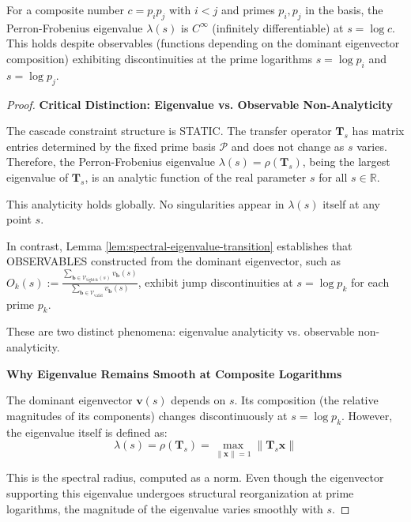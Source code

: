 \begin{lemma}
\label{lem:smoothness-composites}
For a composite number $c = p_i p_j$ with $i < j$ and primes $p_i, p_j$ in the basis, the Perron-Frobenius eigenvalue $\lambda(s)$ is $C^\infty$ (infinitely differentiable) at $s = \log c$. This holds despite observables (functions depending on the dominant eigenvector composition) exhibiting discontinuities at the prime logarithms $s = \log p_i$ and $s = \log p_j$.
\end{lemma}

\begin{proof}

\noindent \textbf{Critical Distinction: Eigenvalue vs. Observable Non-Analyticity}

The cascade constraint structure is STATIC. The transfer operator $\mathbf{T}_s$ has matrix entries determined by the fixed prime basis $\mathcal{P}$ and does not change as $s$ varies. Therefore, the Perron-Frobenius eigenvalue $\lambda(s) = \rho(\mathbf{T}_s)$, being the largest eigenvalue of $\mathbf{T}_s$, is an analytic function of the real parameter $s$ for all $s \in \mathbb{R}$.

This analyticity holds globally. No singularities appear in $\lambda(s)$ itself at any point $s$.

In contrast, Lemma \ref{lem:spectral-eigenvalue-transition} establishes that OBSERVABLES constructed from the dominant eigenvector, such as $O_k(s) := \frac{\sum_{\mathbf{b} \in \mathcal{V}_{\text{tight-k}}(s)} v_{\mathbf{b}}(s)}{\sum_{\mathbf{b} \in \mathcal{V}_{\text{valid}}} v_{\mathbf{b}}(s)}$, exhibit jump discontinuities at $s = \log p_k$ for each prime $p_k$.

These are two distinct phenomena: eigenvalue analyticity vs. observable non-analyticity.

\noindent \textbf{Why Eigenvalue Remains Smooth at Composite Logarithms}

The dominant eigenvector $\mathbf{v}(s)$ depends on $s$. Its composition (the relative magnitudes of its components) changes discontinuously at $s = \log p_k$. However, the eigenvalue itself is defined as:
\begin{equation}
\lambda(s) = \rho(\mathbf{T}_s) = \max_{\|\mathbf{x}\| = 1} \|\mathbf{T}_s \mathbf{x}\|
\end{equation}

This is the spectral radius, computed as a norm. Even though the eigenvector supporting this eigenvalue undergoes structural reorganization at prime logarithms, the magnitude of the eigenvalue varies smoothly with $s$.


\end{proof}
